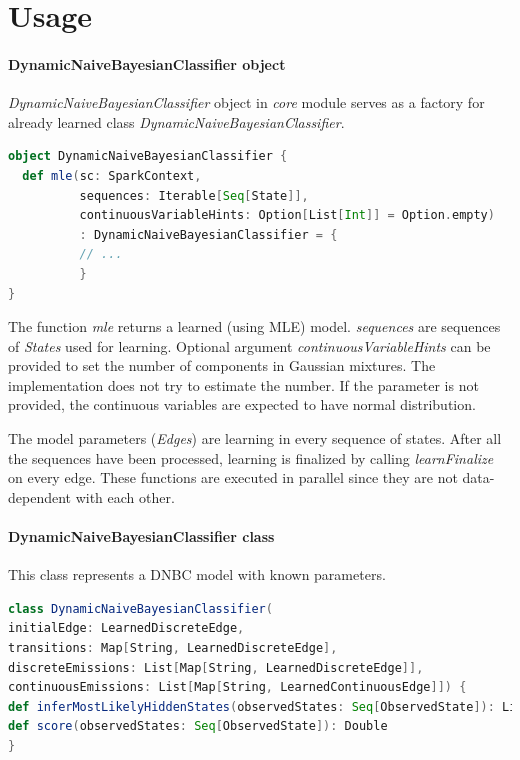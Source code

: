 \documentclass[thesis=B,english]{FITthesis}[2012/06/26]
\begin{document}
\section{Usage}

\paragraph{DynamicNaiveBayesianClassifier object}

\textit{DynamicNaiveBayesianClassifier} object in \textit{core} module serves as a factory for already learned class \textit{DynamicNaiveBayesianClassifier}.

\begin{lstlisting}[language=Scala]
object DynamicNaiveBayesianClassifier {
  def mle(sc: SparkContext,
          sequences: Iterable[Seq[State]],
          continuousVariableHints: Option[List[Int]] = Option.empty)
          : DynamicNaiveBayesianClassifier = {
          // ...
          }
}
\end{lstlisting}

The function \textit{mle} returns a learned (using MLE) model. \textit{sequences} are sequences of \textit{States} used for learning. Optional argument \textit{continuousVariableHints} can be provided to set the number of components in Gaussian mixtures. The implementation does not try to estimate the number. If the parameter is not provided, the continuous variables are expected to have normal distribution.

The model parameters (\textit{Edges}) are learning in every sequence of states. After all the sequences have been processed, learning is finalized by calling \textit{learnFinalize} on every edge. These functions are executed in parallel since they are not data-dependent with each other.

\paragraph{DynamicNaiveBayesianClassifier class}

This class represents a DNBC model with known parameters.

\begin{lstlisting}[language=Scala]
class DynamicNaiveBayesianClassifier(
initialEdge: LearnedDiscreteEdge,
transitions: Map[String, LearnedDiscreteEdge],
discreteEmissions: List[Map[String, LearnedDiscreteEdge]],
continuousEmissions: List[Map[String, LearnedContinuousEdge]]) {
def inferMostLikelyHiddenStates(observedStates: Seq[ObservedState]): List[String]
def score(observedStates: Seq[ObservedState]): Double
}
\end{lstlisting}
\end{document}
